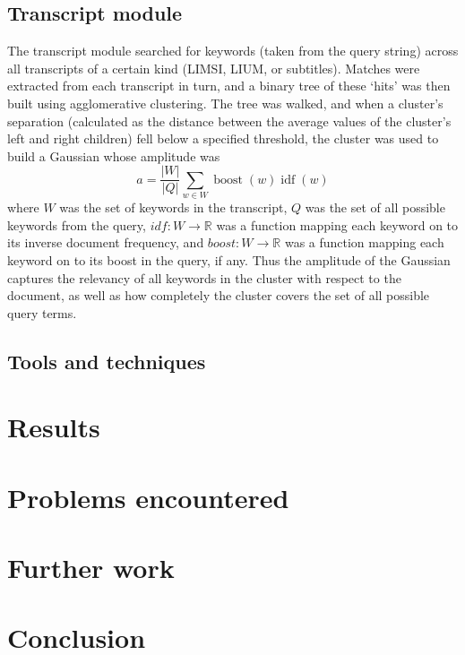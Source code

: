 \documentclass{../acm_proc_article-me11_tweaked}
\begin{document}
\subsection{Transcript module}
The transcript module searched for keywords (taken from the query string) 
across all transcripts of a certain kind (LIMSI, LIUM, or subtitles). Matches 
were extracted from each transcript in turn, and a binary tree of these `hits' 
was then built using agglomerative clustering. The tree was walked, and when 
a cluster's separation (calculated as the distance between the average values 
of the cluster's left and right children) fell below a specified threshold, 
the cluster was used to build a Gaussian whose amplitude was
\[a = \frac{| W |}{| Q |} \sum_{w \in W} \operatorname{boost}(w) \operatorname{idf}(w)\]
where \(W\) was the set of keywords in the transcript, \(Q\) was the set of 
all possible keywords from the query, \(idf : W \to \mathbb{R}\) was a 
function mapping each keyword on to its inverse document frequency, and 
\(boost : W \to \mathbb{R}\) was a function mapping each keyword on to its 
boost in the query, if any. Thus the amplitude of the Gaussian captures the 
relevancy of all keywords in the cluster with respect to the document, as well 
as how completely the cluster covers the set of all possible query terms.

\subsection{Tools and techniques}

\section{Results}

\section{Problems encountered}

\section{Further work}

\section{Conclusion}



\end{document}
